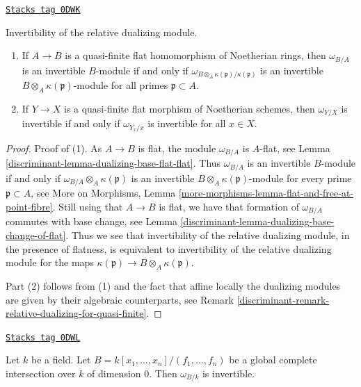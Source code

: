 \begin{lemma}
\label{discriminant-lemma-characterize-invertible}
\href{https://stacks.math.columbia.edu/tag/0DWK}{\texttt{Stacks tag 0DWK}}

Invertibility of the relative dualizing module.
\begin{enumerate}
\item If $A \to B$ is a quasi-finite flat homomorphism of Noetherian rings,
then $\omega_{B/A}$ is an invertible $B$-module if and only if
$\omega_{B \otimes_A \kappa(\mathfrak p)/\kappa(\mathfrak p)}$
is an invertible $B \otimes_A \kappa(\mathfrak p)$-module
for all primes $\mathfrak p \subset A$.
\item If $Y \to X$ is a quasi-finite flat morphism of
Noetherian schemes, then $\omega_{Y/X}$ is invertible
if and only if $\omega_{Y_x/x}$ is invertible for all $x \in X$.
\end{enumerate}
\end{lemma}

\begin{proof}

Proof of (1). As $A \to B$ is flat, the module
$\omega_{B/A}$ is $A$-flat, see Lemma \ref{discriminant-lemma-dualizing-base-flat-flat}.
Thus $\omega_{B/A}$ is an invertible $B$-module if and only if
$\omega_{B/A} \otimes_A \kappa(\mathfrak p)$
is an invertible $B \otimes_A \kappa(\mathfrak p)$-module for
every prime $\mathfrak p \subset A$, see More on Morphisms, Lemma
\ref{more-morphisms-lemma-flat-and-free-at-point-fibre}.
Still using that $A \to B$ is flat, we have that
formation of $\omega_{B/A}$ commutes with base change, see
Lemma \ref{discriminant-lemma-dualizing-base-change-of-flat}.
Thus we see that invertibility of the relative dualizing module,
in the presence of flatness, is equivalent to invertibility
of the relative dualizing module for the maps
$\kappa(\mathfrak p) \to B \otimes_A \kappa(\mathfrak p)$.

\medskip\noindent
Part (2) follows from (1) and the fact that affine locally
the dualizing modules are given by their algebraic counterparts, see
Remark \ref{discriminant-remark-relative-dualizing-for-quasi-finite}.
\end{proof}

\begin{lemma}
\label{discriminant-lemma-dim-zero-global-complete-intersection-over-field}
\href{https://stacks.math.columbia.edu/tag/0DWL}{\texttt{Stacks tag 0DWL}}

Let $k$ be a field. Let $B = k[x_1, \ldots, x_n]/(f_1, \ldots, f_n)$
be a global complete intersection over $k$ of dimension $0$.
Then $\omega_{B/k}$ is invertible.
\end{lemma}

